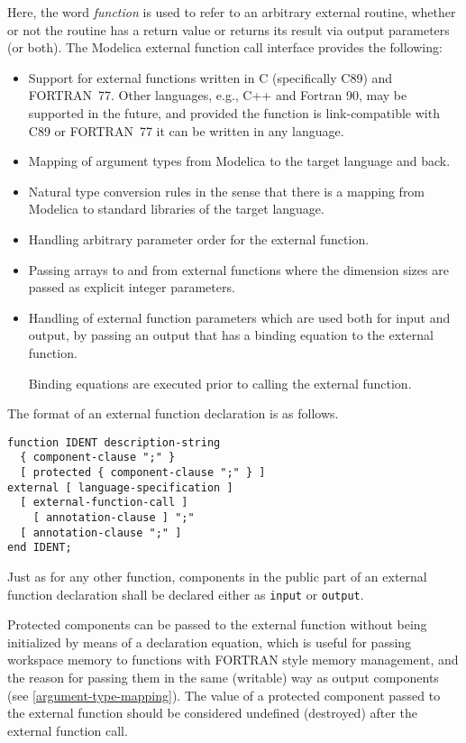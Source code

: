 Here, the word \emph{function} is used to refer to an arbitrary external routine, whether or not the routine has a return value or returns its result via output parameters (or both).
The Modelica external function call interface provides the following:
\begin{itemize}
\item
  Support for external functions written in C (specifically C89) and
  FORTRAN~77. Other languages, e.g., C++ and Fortran 90, may be supported
  in the future, and provided the function is link-compatible with C89
  or FORTRAN~77 it can be written in any language.
\item
  Mapping of argument types from Modelica to the target language and
  back.
\item
  Natural type conversion rules in the sense that there is a mapping
  from Modelica to standard libraries of the target language.
\item
  Handling arbitrary parameter order for the external function.
\item
  Passing arrays to and from external functions where the dimension
  sizes are passed as explicit integer parameters.
\item
  Handling of external function parameters which are used both for input
  and output, by passing an output that has a binding equation to
  the external function.
  \begin{nonnormative}
  Binding equations are executed prior to calling the external function.
  \end{nonnormative}
\end{itemize}

The format of an external function declaration is as follows.
\begin{lstlisting}[language=grammar]
function IDENT description-string
  { component-clause ";" }
  [ protected { component-clause ";" } ]
external [ language-specification ]
  [ external-function-call ]
    [ annotation-clause ] ";"
  [ annotation-clause ";" ]
end IDENT;
\end{lstlisting}%

Just as for any other function, components in the public part of an external function declaration shall be declared either as {\lstinline!input!} or {\lstinline!output!}.

Protected components can be passed to the external function without being initialized by means of a declaration equation, which is useful for passing workspace memory to functions with FORTRAN style memory management, and the reason for passing them in the same (writable) way as output components (see \cref{argument-type-mapping}).
The value of a protected component passed to the external function should be considered undefined (destroyed) after the external function call.

